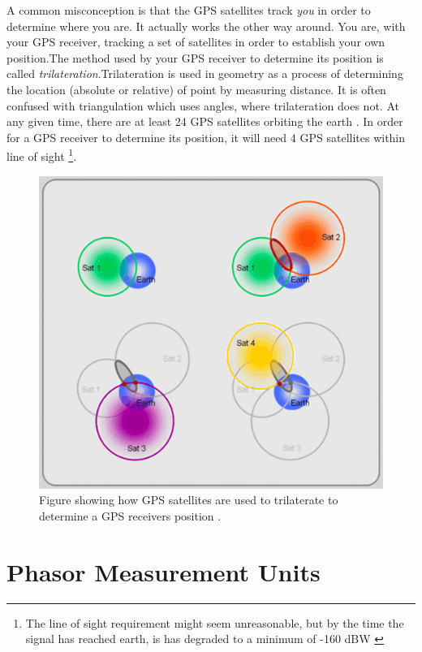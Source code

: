 \documentclass[12pt,english,a4paper]{article}
\begin{document}
A common misconception is that the GPS satellites track \textit{you} in order to determine where you are. It actually works the other way around. You are, with your GPS receiver, tracking a set of satellites in order to establish your own position.The method used by your GPS receiver to determine its position is called \textit{trilateration}.Trilateration is used in geometry as a process of determining the location (absolute or relative) of point by measuring distance. It is often confused with triangulation which uses angles, where trilateration does not. At any given time, there are at least 24 GPS satellites orbiting the earth \cite{GPSGOV}. In order for a GPS receiver to determine its position, it will need 4 GPS satellites within line of sight \footnote{The line of sight requirement might seem unreasonable, but by the time the signal has reached earth, is has degraded to a minimum of -160 dBW \cite{NATINT}}. 
\begin{figure}[hb]
  \centering
  \includegraphics[scale=0.4]{trilaterate.jpg}
  \caption[GPS trilaterate figure]
   {Figure showing how GPS satellites are used to trilaterate to determine a GPS receivers position \cite{GISTRILATERATE}.}
\end{figure}

\section{Phasor Measurement Units}
\end{document}

